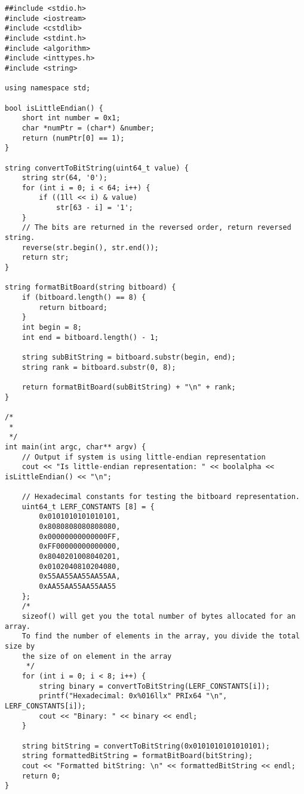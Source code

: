 \begin{verbatim}
##include <stdio.h>
#include <iostream>
#include <cstdlib>
#include <stdint.h>
#include <algorithm> 
#include <inttypes.h>
#include <string>

using namespace std;

bool isLittleEndian() {
    short int number = 0x1;
    char *numPtr = (char*) &number;
    return (numPtr[0] == 1);
}

string convertToBitString(uint64_t value) {
    string str(64, '0');
    for (int i = 0; i < 64; i++) {
        if ((1ll << i) & value)
            str[63 - i] = '1';
    }
    // The bits are returned in the reversed order, return reversed string.
    reverse(str.begin(), str.end());
    return str;
}

string formatBitBoard(string bitboard) {
    if (bitboard.length() == 8) {
        return bitboard;
    }
    int begin = 8;
    int end = bitboard.length() - 1;

    string subBitString = bitboard.substr(begin, end);
    string rank = bitboard.substr(0, 8);

    return formatBitBoard(subBitString) + "\n" + rank;
}

/*
 * 
 */
int main(int argc, char** argv) {
    // Output if system is using little-endian representation
    cout << "Is little-endian representation: " << boolalpha << isLittleEndian() << "\n";

    // Hexadecimal constants for testing the bitboard representation.
    uint64_t LERF_CONSTANTS [8] = {
        0x0101010101010101,
        0x8080808080808080,
        0x00000000000000FF,
        0xFF00000000000000,
        0x8040201008040201,
        0x0102040810204080,
        0x55AA55AA55AA55AA,
        0xAA55AA55AA55AA55
    };
    /*
    sizeof() will get you the total number of bytes allocated for an array.
    To find the number of elements in the array, you divide the total size by
    the size of on element in the array
     */
    for (int i = 0; i < 8; i++) {
        string binary = convertToBitString(LERF_CONSTANTS[i]);
        printf("Hexadecimal: 0x%016llx" PRIx64 "\n", LERF_CONSTANTS[i]);
        cout << "Binary: " << binary << endl;
    }

    string bitString = convertToBitString(0x0101010101010101);
    string formattedBitString = formatBitBoard(bitString);
    cout << "Formatted bitString: \n" << formattedBitString << endl;
    return 0;
}
\end{verbatim}